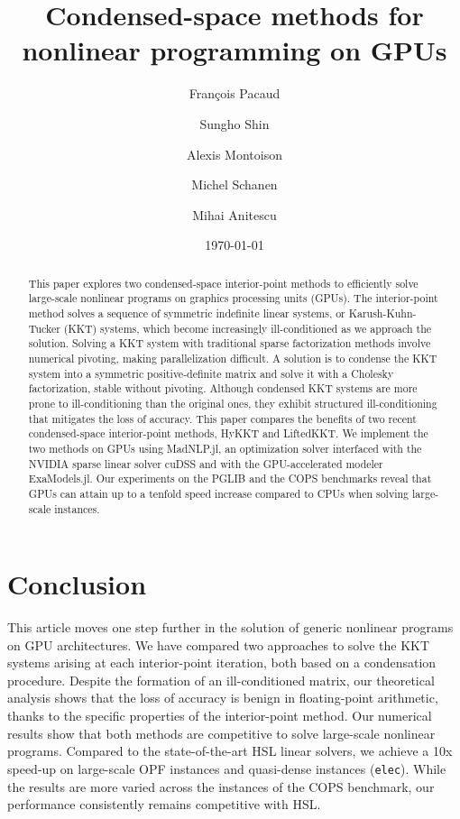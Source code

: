 \documentclass[smallextended]{svjour3}
\title{Condensed-space methods for nonlinear programming on GPUs}
\author{François Pacaud \and
Sungho Shin \and
Alexis Montoison \and
Michel Schanen \and
Mihai Anitescu
}
\date{\today}
\begin{document}
\maketitle

\begin{abstract}
  This paper explores two condensed-space interior-point methods to efficiently solve large-scale nonlinear programs on graphics processing units (GPUs).
  The interior-point method solves a sequence of symmetric indefinite linear systems, or Karush-Kuhn-Tucker (KKT) systems,
  which become increasingly ill-conditioned as we approach the solution.
  Solving a KKT system with traditional sparse factorization methods involve numerical pivoting, making parallelization difficult.
  A solution is to condense the KKT system into a symmetric positive-definite matrix and solve it with a Cholesky factorization, stable without pivoting.
  Although condensed KKT systems are more prone to ill-conditioning than the original ones, they exhibit structured ill-conditioning that mitigates the loss of accuracy.
  This paper compares the benefits of two recent condensed-space interior-point methods, HyKKT and LiftedKKT.
  We implement the two methods on GPUs using MadNLP.jl, an optimization solver interfaced with the NVIDIA sparse linear solver cuDSS
  and with the GPU-accelerated modeler ExaModels.jl.
  Our experiments on the PGLIB and the COPS benchmarks reveal that GPUs can attain up to a tenfold
  speed increase compared to CPUs when solving large-scale instances.
\end{abstract}









\section{Conclusion}
This article moves one step further in the solution of generic nonlinear
programs on GPU architectures. We have compared two approaches
to solve the KKT systems arising at each interior-point iteration, both
based on a condensation procedure.
Despite the formation of an ill-conditioned matrix, our theoretical analysis shows that the loss of accuracy is benign in floating-point arithmetic, thanks to the specific properties of the interior-point method.
Our numerical results show that both methods are competitive to solve large-scale
nonlinear programs.
Compared to the state-of-the-art HSL linear solvers, we achieve a 10x speed-up on large-scale OPF instances and quasi-dense instances (\texttt{elec}). While the results are more varied across the instances of the COPS benchmark, our performance consistently remains competitive with HSL.
\end{document}
